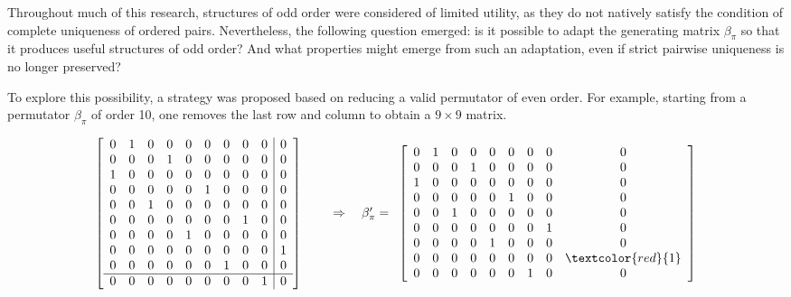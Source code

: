 \documentclass{article}
\begin{document}
Throughout much of this research, structures of odd order were considered of limited utility, as they do not natively satisfy the condition of complete uniqueness of ordered pairs. Nevertheless, the following question emerged: is it possible to adapt the generating matrix \(\beta_\pi\) so that it produces useful structures of odd order? And what properties might emerge from such an adaptation, even if strict pairwise uniqueness is no longer preserved?

\medskip

To explore this possibility, a strategy was proposed based on reducing a valid permutator of even order. For example, starting from a permutator \(\beta_\pi\) of order 10, one removes the last row and column to obtain a \(9 \times 9\) matrix.

\[
\begin{array}{cc}
\begin{array}{c}
\left[
\begin{array}{ccccccccc|c}
0 & 1 & 0 & 0 & 0 & 0 & 0 & 0 & 0 & 0 \\
0 & 0 & 0 & 1 & 0 & 0 & 0 & 0 & 0 & 0 \\
1 & 0 & 0 & 0 & 0 & 0 & 0 & 0 & 0 & 0 \\
0 & 0 & 0 & 0 & 0 & 1 & 0 & 0 & 0 & 0 \\
0 & 0 & 1 & 0 & 0 & 0 & 0 & 0 & 0 & 0 \\
0 & 0 & 0 & 0 & 0 & 0 & 0 & 1 & 0 & 0 \\
0 & 0 & 0 & 0 & 1 & 0 & 0 & 0 & 0 & 0 \\
0 & 0 & 0 & 0 & 0 & 0 & 0 & 0 & 0 & 1 \\
0 & 0 & 0 & 0 & 0 & 0 & 1 & 0 & 0 & 0 \\
\hline
0 & 0 & 0 & 0 & 0 & 0 & 0 & 0 & 1 & 0 \\
\end{array}
\right]
\end{array}
&
\quad
\Rightarrow
\quad
\beta_\pi'= 
\begin{array}{c}
\left[
\begin{array}{ccccccccc}
0 & 1 & 0 & 0 & 0 & 0 & 0 & 0 & 0 \\
0 & 0 & 0 & 1 & 0 & 0 & 0 & 0 & 0 \\
1 & 0 & 0 & 0 & 0 & 0 & 0 & 0 & 0 \\
0 & 0 & 0 & 0 & 0 & 1 & 0 & 0 & 0 \\
0 & 0 & 1 & 0 & 0 & 0 & 0 & 0 & 0 \\
0 & 0 & 0 & 0 & 0 & 0 & 0 & 1 & 0 \\
0 & 0 & 0 & 0 & 1 & 0 & 0 & 0 & 0 \\
0 & 0 & 0 & 0 & 0 & 0 & 0 & 0 & \textcolor{red}{1} \\
0 & 0 & 0 & 0 & 0 & 0 & 1 & 0 & 0 \\
\end{array}
\right]
\end{array}
\end{array}
\]
\end{document}
